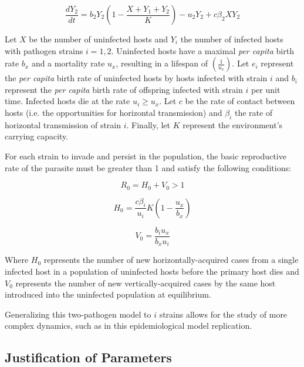 \begin{equation}
\frac{dY_2}{dt} = b_2 Y_2(1 - \frac{X + Y_1 + Y_2}{K}) - u_2 Y_2 + c \beta_2 X Y_2
\label{eqn:3}
\end{equation}

Let $X$ be the number of uninfected hosts and $Y_i$ the number of infected hosts with pathogen strains $i = 1, 2$. Uninfected hosts have a maximal \emph{per capita} birth rate $b_x$ and a mortality rate $u_x$, resulting in a lifespan of $(\frac{1}{u_x})$. Let $e_i$ represent the \emph{per capita} birth rate of uninfected hosts by hosts infected with strain $i$ and $b_i$ represent the \emph{per capita} birth rate of offspring infected with strain $i$ per unit time. Infected hosts die at the rate $u_i \geq u_x$. Let $c$ be the rate of contact between hosts (i.e. the opportunities for horizontal transmission) and $\beta_i$ the rate of horizontal transmission of strain $i$. Finally, let $K$ represent the environment’s carrying capacity.

For each strain to invade and persist in the population, the basic reproductive rate of the parasite must be greater than 1 and satisfy the following conditions:

\begin{equation}
R_0 = H_0 + V_0 > 1
\label{eqn:4}
\end{equation}

\begin{equation}
H_0 = \frac{c \beta_i}{u_i} K(1- \frac{u_x}{b_x})
\label{eqn:5}
\end{equation}

\begin{equation}
V_0 = \frac{b_i u_x}{b_x u_i}
\label{eqn:6}
\end{equation}

Where $H_0$ represents the number of new horizontally-acquired cases from a single infected host in a population of uninfected hosts before the primary host dies and $V_0$ represents the number of new vertically-acquired cases by the same host introduced into the uninfected population at equilibrium.

Generalizing this two-pathogen model to $i$ strains allows for the study of more complex dynamics, such as in this epidemiological model replication.


\subsection{Justification of Parameters}


